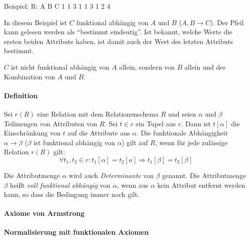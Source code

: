 \documentclass{scrbook}
\begin{document}
Beispiel:
R:
A	B	C
1   1	3
1	1	3
1	2	4


In diesem Beispiel ist $C$ funktional abhängig von $A$ und $B$ ($A, B → C$).
Der Pfeil kann gelesen werden als \enquote{bestimmt eindeutig}.
Ist bekannt, welche Werte die ersten beiden Attribute haben, 
ist damit auch der Wert des letzten Attributs bestimmt.

$C$ ist nicht funktional abhängig von $A$ allein, sondern von $B$ allein
und der Kombination von $A$ und $B$.


\paragraph{Definition}


\begin{definition}
Sei $r(R)$ eine Relation mit dem Relationenschema $R$ und seien $α$ und $β$
Teilmengen von Attributen von $R$.
Sei $t ∈ r$ ein Tupel aus $r$. Dann ist $t[α]$ die Einschränkung von $t$ auf die Attribute aus $α$.
Die funktionale Abhängigkeit $α → β$ ($β$ ist funktional abhängig von $α$) gilt auf $R$,
wenn für jede zulässige Relation $r(R)$ gilt:
\begin{displaymath}
∀t_1,t_2 ∈ r: t_1[α] = t_2[a] ⇒ t_1[β] = t_2[β]
\end{displaymath}

Die Attributmenge $α$ wird auch \emph{Determinante} von $β$ genannt.
Die Attributmenge $β$ heißt \emph{voll funktional abhängig} von $α$,
wenn aus $α$ kein Attribut entfernt werden kann, so dass die Bedingung immer noch gilt.
\end{definition}


\paragraph{Axiome von Armstrong}


\paragraph{Normalisierung mit funktionalen Axiomen}
\end{document}
